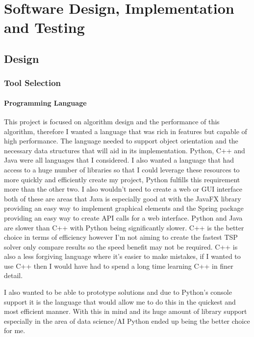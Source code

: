\chapter{Software Design, Implementation and Testing}

\section{Design}

\subsection{Tool Selection }

\subsubsection{Programming Language}

This project is focused on algorithm design and the performance of this algorithm, therefore I wanted a language that was rich in features but capable of high performance. The language needed to support object orientation and the necessary data structures that will aid in its implementation. Python, C++ and Java were all languages that I considered. I also wanted a language that had access to a huge number of libraries so that I could leverage these resources to more quickly and efficiently create my project, Python fulfills this requirement more than the other two. I also wouldn't need to create a web or GUI interface both of these are areas that Java is especially good at with the JavaFX library providing an easy way to implement graphical elements and the Spring package providing an easy way to create API calls for a web interface. Python and Java are slower than C++\cite{java_vs_c++}\cite{c++_vs_python} with Python being significantly slower. C++ is the better choice in terms of efficiency however I'm not aiming to create the fastest TSP solver only compare results so the speed benefit may not be required. C++ is also a less forgiving language where it's easier to make mistakes, if I wanted to use C++ then I would have had to spend a long time learning C++ in finer detail. 

I also wanted to be able to prototype solutions and due to Python's console support it is the language that would allow me to do this in the quickest and most efficient manner. With this in mind and its huge amount of library support especially in the area of data science/AI Python ended up being the better choice for me. 

